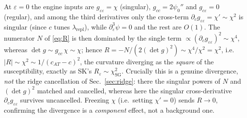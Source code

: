 \documentclass[a4paper,11pt]{article}
\theoremstyle{plain}
\theoremstyle{definition}
\theoremstyle{remark}
\newcommand{\Ric}{R}
\newcommand{\eps}{\varepsilon}
\newcommand{\detg}{\det g}
\newcommand{\repl}{\lambda_{\mathrm{repl}}}
\begin{document}
At $\eps=0$ the engine inputs are $g_{\eps\eps}=\chi$ (singular), $g_{cc}=2\psi_0''$ and $g_{c\eps}=0$
(regular), and among the third derivatives only the cross-term $\partial_c g_{\eps\eps}=\chi'\sim\chi^2$ is
singular (since $c$ tunes $\repl$), while $\partial_\eps^3\psi=0$ and the rest are $O(1)$. The numerator $N$
of \eqref{eq:R} is then dominated by the single term $\propto(\partial_c g_{\eps\eps})^2\sim\chi^4$, whereas
$\detg\sim g_{cc}\,\chi\sim\chi$; hence $\Ric=-N/(2(\detg)^2)\sim\chi^4/\chi^2=\chi^2$, i.e.
$|\Ric|\sim\chi^2\sim1/(c_{AT}-c)^2$, the curvature diverging as the \emph{square} of the susceptibility,
exactly as SK's $\Ric_\eps\sim\chi_{\mathrm{SG}}^2$. Crucially this is a genuine divergence, \emph{not} the
ridge cancellation of Sec.~\ref{sec:ridge}: there the singular powers of $N$ and $(\detg)^2$ matched and
cancelled, whereas here the singular cross-derivative $\partial_c g_{\eps\eps}$ survives uncancelled.
Freezing $\chi$ (i.e.\ setting $\chi'=0$) sends $\Ric\to0$, confirming the divergence is a \emph{component}
effect, not a background one.
\end{document}
